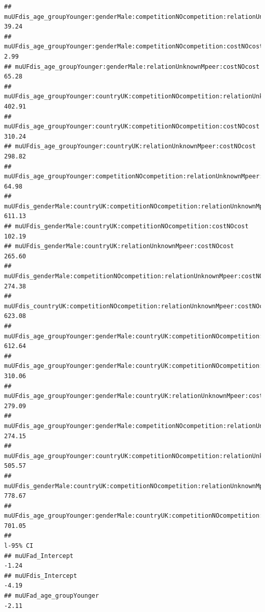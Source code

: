 \documentclass[
]{article}
\begin{document}
\begin{verbatim}
## muUFdis_age_groupYounger:genderMale:competitionNOcompetition:relationUnknownMpeer                          39.24
## muUFdis_age_groupYounger:genderMale:competitionNOcompetition:costNOcost                                     2.99
## muUFdis_age_groupYounger:genderMale:relationUnknownMpeer:costNOcost                                        65.28
## muUFdis_age_groupYounger:countryUK:competitionNOcompetition:relationUnknownMpeer                          402.91
## muUFdis_age_groupYounger:countryUK:competitionNOcompetition:costNOcost                                    310.24
## muUFdis_age_groupYounger:countryUK:relationUnknownMpeer:costNOcost                                        298.82
## muUFdis_age_groupYounger:competitionNOcompetition:relationUnknownMpeer:costNOcost                          64.98
## muUFdis_genderMale:countryUK:competitionNOcompetition:relationUnknownMpeer                                611.13
## muUFdis_genderMale:countryUK:competitionNOcompetition:costNOcost                                          102.19
## muUFdis_genderMale:countryUK:relationUnknownMpeer:costNOcost                                              265.60
## muUFdis_genderMale:competitionNOcompetition:relationUnknownMpeer:costNOcost                               274.38
## muUFdis_countryUK:competitionNOcompetition:relationUnknownMpeer:costNOcost                                623.08
## muUFdis_age_groupYounger:genderMale:countryUK:competitionNOcompetition:relationUnknownMpeer               612.64
## muUFdis_age_groupYounger:genderMale:countryUK:competitionNOcompetition:costNOcost                         310.06
## muUFdis_age_groupYounger:genderMale:countryUK:relationUnknownMpeer:costNOcost                             279.09
## muUFdis_age_groupYounger:genderMale:competitionNOcompetition:relationUnknownMpeer:costNOcost              274.15
## muUFdis_age_groupYounger:countryUK:competitionNOcompetition:relationUnknownMpeer:costNOcost               505.57
## muUFdis_genderMale:countryUK:competitionNOcompetition:relationUnknownMpeer:costNOcost                     778.67
## muUFdis_age_groupYounger:genderMale:countryUK:competitionNOcompetition:relationUnknownMpeer:costNOcost    701.05
##                                                                                                        l-95% CI
## muUFad_Intercept                                                                                          -1.24
## muUFdis_Intercept                                                                                         -4.19
## muUFad_age_groupYounger                                                                                   -2.11

\end{verbatim}
\end{document}
